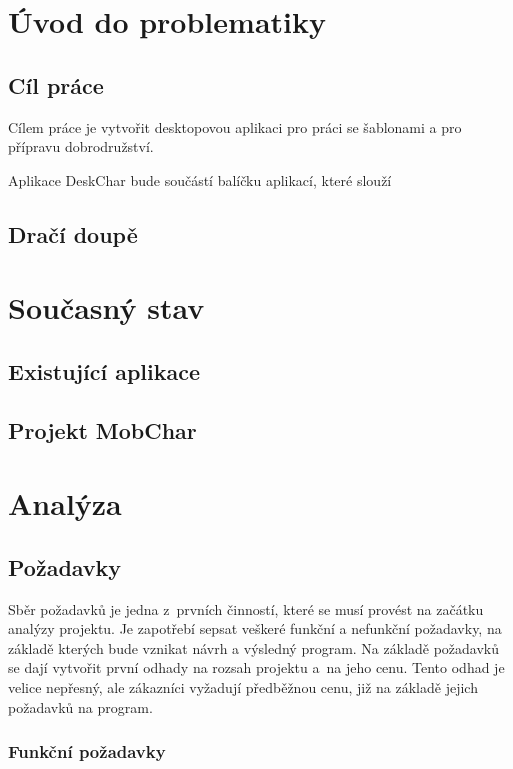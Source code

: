 \documentclass[thesis=B,czech]{resources/FITthesis}[2012/06/26]
\begin{document}
\chapter{Úvod do problematiky}




	\section{Cíl práce}
Cílem práce je vytvořit desktopovou aplikaci pro práci se šablonami a pro přípravu dobrodružství.

Aplikace DeskChar bude součástí balíčku aplikací, které slouží

	\section{Dračí doupě}

\chapter{Současný stav}

\section{Existující aplikace}

\section{Projekt MobChar}



\chapter{Analýza}

\section{Požadavky}



Sběr požadavků je jedna z~prvních činností, které se musí provést na začátku analýzy projektu. Je zapotřebí sepsat veškeré funkční a nefunkční požadavky, na základě kterých bude vznikat návrh a výsledný program. Na základě požadavků se dají vytvořit první odhady na rozsah projektu a~na jeho cenu. Tento odhad je velice nepřesný, ale zákazníci vyžadují předběžnou cenu, již na základě jejich požadavků na program. 
	
\subsection{Funkční požadavky}
\end{document}
